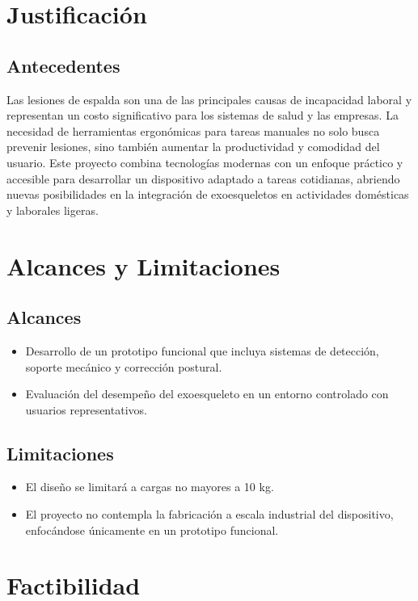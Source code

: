 \section{Justificación}
\subsection{Antecedentes}
Las lesiones de espalda son una de las principales causas de incapacidad laboral y representan un costo significativo para los sistemas de salud y las empresas. La necesidad de herramientas ergonómicas para tareas manuales no solo busca prevenir lesiones, sino también aumentar la productividad y comodidad del usuario. Este proyecto combina tecnologías modernas con un enfoque práctico y accesible para desarrollar un dispositivo adaptado a tareas cotidianas, abriendo nuevas posibilidades en la integración de exoesqueletos en actividades domésticas y laborales ligeras.


\section{Alcances y Limitaciones}
\subsection{Alcances}
\begin{itemize}
    \item Desarrollo de un prototipo funcional que incluya sistemas de detección, soporte mecánico y corrección postural.
    \item Evaluación del desempeño del exoesqueleto en un entorno controlado con usuarios representativos.
\end{itemize}

\subsection{Limitaciones}
\begin{itemize}
    \item El diseño se limitará a cargas no mayores a 10 kg.
    \item El proyecto no contempla la fabricación a escala industrial del dispositivo, enfocándose únicamente en un prototipo funcional.
\end{itemize}


\section{Factibilidad}
